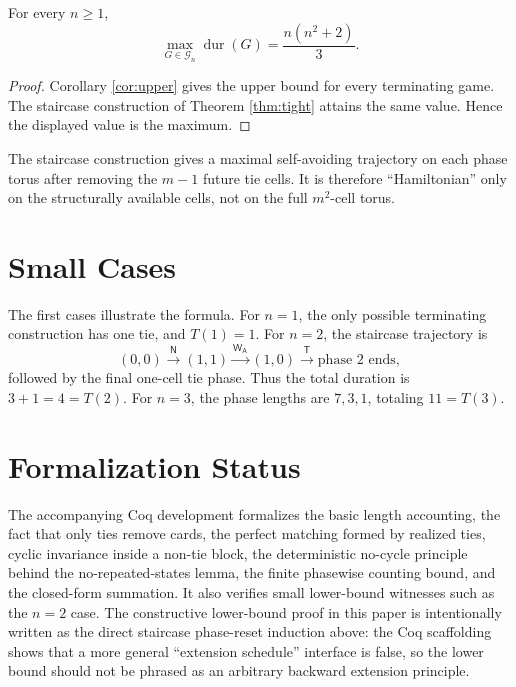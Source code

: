 \documentclass[12pt]{article}
\DeclareMathOperator{\dur}{dur}
\newcommand{\WA}{\mathsf{W_A}}
\newcommand{\TT}{\mathsf{T}}
\newcommand{\NN}{\mathsf{N}}
\begin{document}
\begin{theorem}\label{thm:main}
For every $n\ge 1$,
\[
\max_{G\in\mathcal G_n}\dur(G)=\frac{n(n^2+2)}{3}.
\]
\end{theorem}
\begin{proof}
Corollary \ref{cor:upper} gives the upper bound for every terminating game. The staircase construction of Theorem \ref{thm:tight} attains the same value. Hence the displayed value is the maximum.
\end{proof}

\begin{remark}\label{rem:spiral}
The staircase construction gives a maximal self-avoiding trajectory on each phase torus after removing the $m-1$ future tie cells. It is therefore ``Hamiltonian'' only on the structurally available cells, not on the full $m^2$-cell torus.
\end{remark}

\section{Small Cases}\label{sec:small_cases}
The first cases illustrate the formula. For $n=1$, the only possible terminating construction has one tie, and $T(1)=1$. For $n=2$, the staircase trajectory is
\[
(0,0)\xrightarrow{\NN}(1,1)\xrightarrow{\WA}(1,0)\xrightarrow{\TT}\text{phase }2\text{ ends},
\]
followed by the final one-cell tie phase. Thus the total duration is $3+1=4=T(2)$. For $n=3$, the phase lengths are $7,3,1$, totaling $11=T(3)$.

\section{Formalization Status}\label{sec:formalization}
The accompanying Coq development formalizes the basic length accounting, the fact that only ties remove cards, the perfect matching formed by realized ties, cyclic invariance inside a non-tie block, the deterministic no-cycle principle behind the no-repeated-states lemma, the finite phasewise counting bound, and the closed-form summation. It also verifies small lower-bound witnesses such as the $n=2$ case. The constructive lower-bound proof in this paper is intentionally written as the direct staircase phase-reset induction above: the Coq scaffolding shows that a more general ``extension schedule'' interface is false, so the lower bound should not be phrased as an arbitrary backward extension principle.
\end{document}
